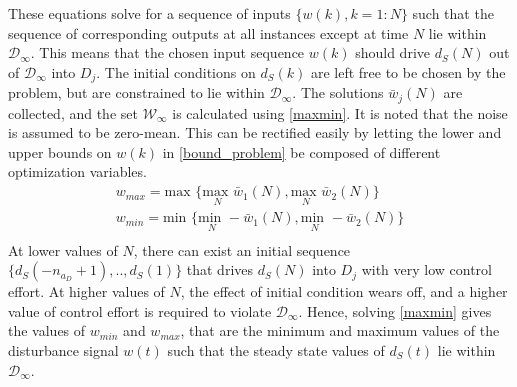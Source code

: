 \documentclass[letterpaper, 10 pt, conference]{ieeeconf}  %
\begin{document}
	These equations solve for a sequence of inputs $\{w(k), k={1:N}\}$ such that the sequence of corresponding outputs at all instances except at time $N$ lie within $\mathcal{D}_{\infty}$. This means that the chosen input sequence $w(k)$ should drive $d_S(N)$ out of $\mathcal{D}_{\infty}$ into $D_j$. The initial conditions on $d_S(k)$ are left free to be chosen by the problem, but are constrained to lie within $\mathcal{D}_{\infty}$.
	The solutions $\bar{w}_j(N)$ are collected, and the set $\mathcal{W}_{\infty}$ is calculated using \eqref{maxmin}. It is noted that the noise is assumed to be zero-mean. This can be rectified easily by letting the lower and upper bounds on $w(k)$ in \eqref{bound_problem} be composed of different optimization variables.
	\begin{equation}
		\begin{matrix}
		w_{max} = {\text{max }}\{\underset{N}{\text{max }} \bar{w}_1(N),\underset{N}{\text{max }}\bar{w}_2(N)\} \\
		w_{min} = {\text{min }}\{\underset{N}{\text{min }}-\bar{w}_1(N),\underset{N}{\text{min }}-\bar{w}_2(N)\} \\
		\end{matrix}
		\label{maxmin}
	\end{equation}
	At lower values of $N$, there can exist an initial sequence $\{d_S(-n_{a_D}+1),..,d_S(1)\}$ that drives $d_S(N)$ into $D_j$ with very low control effort. At higher values of $N$, the effect of initial condition wears off, and a higher value of control effort is required to violate $\mathcal{D}_{\infty}$. Hence, solving \eqref{maxmin} gives the values of $w_{min}$ and $w_{max}$, that are the minimum and maximum values of the disturbance signal $w(t)$ such that the steady state values of $d_S(t)$ lie within $\mathcal{D}_{\infty}$.  
\end{document}
